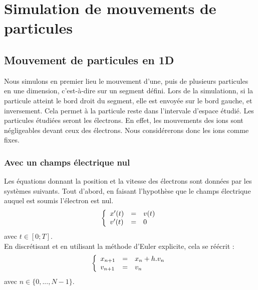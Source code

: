 \documentclass{article}
\begin{document}
\section*{Simulation de mouvements de particules}
\subsection*{Mouvement de particules en 1D}
Nous simulons en premier lieu le mouvement d'une, puis de plusieurs particules en une dimension, c'est-à-dire sur un segment défini. Lors de la simulationn, si la particule atteint le bord droit du segment, elle est envoyée sur le bord gauche, et inversement. Cela permet à la particule reste dans l'intervale d'espace étudié. Les particules étudiées seront les électrons. En effet, les mouvements des ions sont négligeables devant ceux des électrons. Nous considérerons donc les ions comme fixes.
\subsubsection*{Avec un champs électrique nul}
Les équations donnant la position et la vitesse des électrons sont données par les systèmes suivants. Tout d'abord, en faisant l'hypothèse que le champs électrique auquel est soumis l'électron est nul.
$$
\left \{
   \begin{array}{l l l}
      x'(t)  & = & v(t) \\
      v'(t)  & = & 0 \\
	\end{array}
\right.
$$
avec $t \in [0;T]$.\\
En discrétisant et en utilisant la méthode d'Euler explicite, cela se réécrit :
$$
\left \{
   \begin{array}{l l l}
      x_{n+1}  & = & x_n + h.v_n \\
      v_{n+1}  & = & v_n \\
	\end{array}
\right.
$$
avec $n \in \{0,...,N-1\}$.\\
\end{document}
